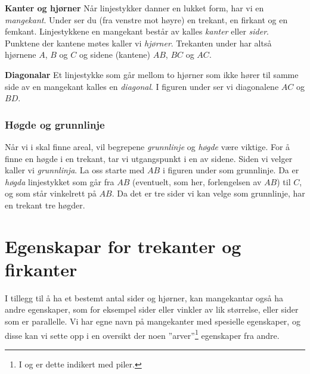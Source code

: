 \begin{comment}
\reg[Samsvarande vinklar]{
	Vinkler med eit høgre eller venstre vinkelbein felles, kallast \textit{samsvarende vinkler}. I figuren under er dei markerte vinklane samsvarande fordi alle tre har den raude linja som venstre vinkelbein.
\fig{vink4}
	Vinklar med parvis parallelle høgre og venstre vinkelbein er like store.
\fig{vink4b}
}
\end{comment}
\newpage
\textbf{Kanter og hjørner} \os
Når linjestykker danner en lukket form, har vi en \textit{mangekant}. Under ser du (fra venstre mot høyre) en trekant, en firkant og en femkant.
Linjestykkene en mangekant består av kalles \textit{kanter} eller \textit{sider}. Punktene der kantene møtes kaller vi \textit{hjørner}. Trekanten under har altså hjørnene $ A $, $ B $ og $ C $ og sidene (kantene) $ AB $, $ BC $ og $ AC $.
 \vsk

\textbf{Diagonalar} \os
Et linjestykke som går mellom to hjørner som ikke hører til samme side av en mangekant kalles en \textit{diagonal}. I figuren under ser vi diagonalene $ AC $ og $ BD $.
\newpage
\subsubsection{Høgde og grunnlinje}
Når vi i  skal finne areal, vil begrepene \textit{grunnlinje} og \textit{høgde} være viktige. For å finne en høgde i en trekant, tar vi utgangspunkt i en av sidene. Siden vi velger kaller vi \textit{grunnlinja}. La oss starte med $ AB $ i figuren under som grunnlinje. Da er \textit{høgda} linjestykket som går fra $ AB $ (eventuelt, som her, forlengelsen av $ AB $) til $ C $, og som står vinkelrett på $ AB $.
Da det er tre sider vi kan velge som grunnlinje, har en trekant tre høgder.
\section{Egenskapar for trekanter og firkanter}
I tillegg til å ha et bestemt antal sider og hjørner, kan mangekantar også ha andre egenskaper, som for eksempel sider eller vinkler av lik størrelse, eller sider som er parallelle. Vi har egne navn på mangekanter med spesielle egenskaper, og disse kan vi sette opp i en oversikt der noen ''arver''\footnote{I  og  er dette indikert med piler.} egenskaper fra andre.\regv


